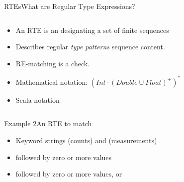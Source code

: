 \newsavebox\exnotebox
\begin{lrbox}{\exnotebox}
  \begin{minipage}{6.5cm}
    
  \end{minipage}
\end{lrbox}


\begin{frame}{RTEs}{What are Regular Type Expressions?}
  \begin{columns}
    \begin{column}{0.55\textwidth}
  \begin{itemize}
  \item An RTE is an  designating a set  of finite sequences
  \item Describes regular \emph{type patterns} sequence content.
  \item RE-matching is a  check.
  \item Mathematical notation: $(Int \cdot (Double \cup Float)^+)^*$
  \item Scala notation\\
    \usebox\exnotebox
  \end{itemize}
    \end{column}%
    \begin{column}{0.45\textwidth}
      \scalebox{0.7}{}
    \end{column}%
  \end{columns}%
\end{frame}


\newsavebox\exampleAbox
\begin{lrbox}{\exampleAbox}
  \begin{minipage}{12cm}
    
  \end{minipage}
\end{lrbox}



\begin{frame}{Example 2}{An RTE to match}
  \usebox\exampleAbox

  \begin{itemize}
  \item Keyword strings  (counts) and  (measurements)
  \item {} followed by zero or more  values
  \item {} followed by zero or more values,  or 
  \end{itemize}
\end{frame}

